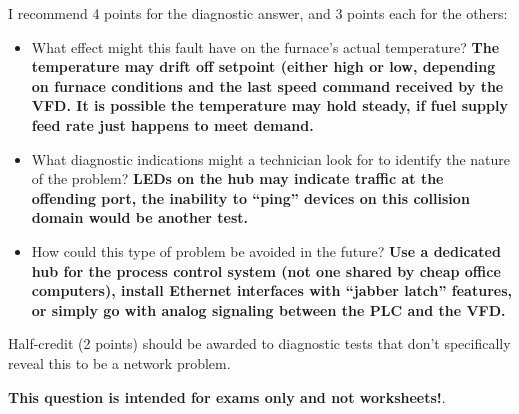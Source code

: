 





I recommend 4 points for the diagnostic answer, and 3 points each for the others:

\begin{itemize}
\item{} What effect might this fault have on the furnace's actual temperature? {\bf The temperature may drift off setpoint (either high or low, depending on furnace conditions and the last speed command received by the VFD.  It is possible the temperature may hold steady, if fuel supply feed rate just happens to meet demand.}
\vskip 10pt
\item{} What diagnostic indications might a technician look for to identify the nature of the problem? {\bf LEDs on the hub may indicate traffic at the offending port, the inability to ``ping'' devices on this collision domain would be another test.}
\vskip 10pt
\item{} How could this type of problem be avoided in the future? {\bf Use a dedicated hub for the process control system (not one shared by cheap office computers), install Ethernet interfaces with ``jabber latch'' features, or simply go with analog signaling between the PLC and the VFD.}
\end{itemize}

Half-credit (2 points) should be awarded to diagnostic tests that don't specifically reveal this to be a network problem.







{\bf This question is intended for exams only and not worksheets!}.



